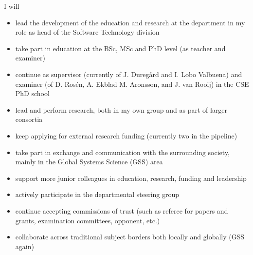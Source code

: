 \documentclass[11pt,twoside,twocolumn]{article}
\begin{document}
I will
\begin{itemize}
\item lead the development of the education and research at the
  department in my role as head of the Software Technology division

\item take part in education at the BSc, MSc and PhD level (as
  teacher and examiner)

\item continue as supervisor (currently of J. Duregård and I. Lobo
  Valbuena) and examiner (of D. Rosén, A. Ekblad M. Aronsson, and
  J. van Rooij) in the CSE PhD school

\item lead and perform research, both in my own group and as part of
  larger consortia

\item keep applying for external research funding (currently two
  in the pipeline)

\item take part in exchange and communication with the surrounding
  society, mainly in the Global Systems Science (GSS) area

\item support more junior colleagues in education, research, funding
  and leadership

\item actively participate in the departmental steering group

\item continue accepting commissions of trust (such as referee for
  papers and grants, examination committees, opponent, etc.)

\item collaborate across traditional subject borders both locally and
  globally (GSS again)
\end{itemize}




\renewcommand{\bibfont}{\small}

%

\end{document}
